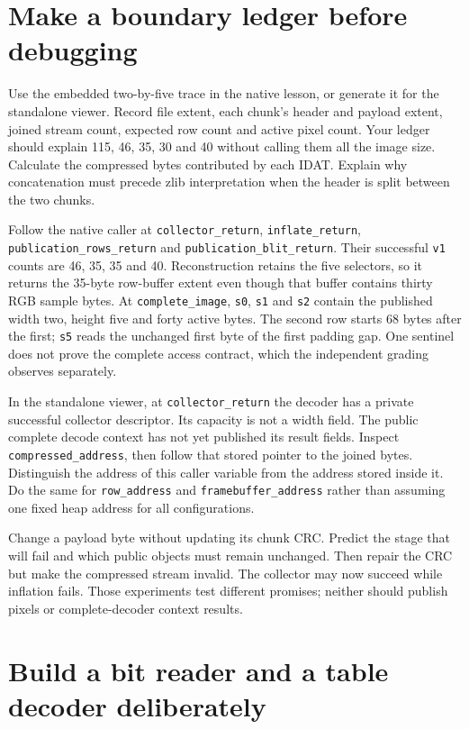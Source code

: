 \section{Make a boundary ledger before debugging}

Use the embedded two-by-five trace in the native lesson, or generate it for
the standalone viewer. Record file extent, each chunk's header and
payload extent, joined stream count, expected row count and active pixel count.
Your ledger should explain 115, 46, 35, 30 and 40 without calling them all the
image size. Calculate the compressed bytes contributed by each IDAT. Explain
why concatenation must precede zlib interpretation when the header is split
between the two chunks.

Follow the native caller at \texttt{collector\_return},
\texttt{inflate\_return}, \texttt{publication\_rows\_return} and
\texttt{publication\_blit\_return}. Their successful \texttt{v1} counts are
46, 35, 35 and 40. Reconstruction retains the five selectors, so it returns
the 35-byte row-buffer extent even though that buffer contains thirty RGB
sample bytes. At \texttt{complete\_image}, \texttt{s0}, \texttt{s1} and
\texttt{s2} contain the published width two, height five and forty active bytes.
The second row starts 68 bytes after the first; \texttt{s5} reads the unchanged
first byte of the first padding gap. One sentinel does not prove the complete
access contract, which the independent grading observes separately.

In the standalone viewer, at \texttt{collector\_return} the decoder has a private successful
collector descriptor. Its capacity is not a width field. The public complete
decode context has not yet published its result fields. Inspect
\texttt{compressed\_address}, then follow that stored pointer to the joined
bytes. Distinguish the address of this caller variable from the address stored
inside it. Do the same for \texttt{row\_address} and
\texttt{framebuffer\_address} rather than assuming one fixed heap address for
all configurations.

Change a payload byte without updating its chunk CRC. Predict the stage that
will fail and which public objects must remain unchanged. Then repair the CRC
but make the compressed stream invalid. The collector may now succeed while
inflation fails. Those experiments test different promises; neither should
publish pixels or complete-decoder context results.

\section{Build a bit reader and a table decoder deliberately}

